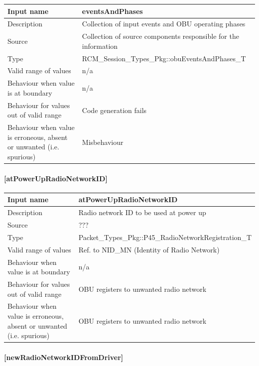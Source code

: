\begin{longtable}{p{}p{}}
	\toprule
	Input name				& eventsAndPhases \\
	\midrule
	Description				& Collection of input events and OBU operating phases \\
	\midrule
	Source					& Collection of source components responsible for the information \\ 
	\midrule
	Type					& RCM\_Session\_Types\_Pkg::obuEventsAndPhases\_T \\
	\midrule
	Valid range of values	& n/a \\
	\midrule
	Behaviour when value is at boundary	& n/a \\
	\midrule
	Behaviour for values out of valid range	& Code generation fails \\
	\midrule
	Behaviour when value is erroneous, absent or unwanted (i.e. spurious) & Misbehaviour \\
	\bottomrule
\end{longtable}

\paragraph{[atPowerUpRadioNetworkID]}

\begin{longtable}{p{}p{}}
	\toprule
	Input name				& atPowerUpRadioNetworkID \\
	\midrule
	Description				& Radio network ID to be used at power up \\
	\midrule
	Source					& ??? \\ 
	\midrule
	Type					& Packet\_Types\_Pkg::P45\_RadioNetworkRegistration\_T \\
	\midrule
	Valid range of values	& Ref. to NID\_MN (Identity of Radio Network)  \\
	\midrule
	Behaviour when value is at boundary	& n/a \\
	\midrule
	Behaviour for values out of valid range	& OBU registers to unwanted radio network \\
	\midrule
	Behaviour when value is erroneous, absent or unwanted (i.e. spurious) & OBU registers to unwanted radio network  \\
	\bottomrule
\end{longtable}

\paragraph{[newRadioNetworkIDFromDriver]}

